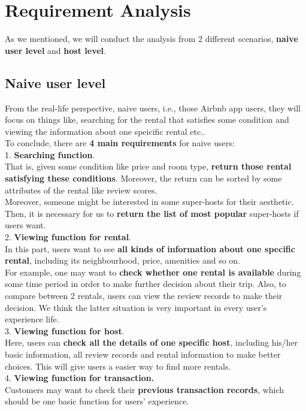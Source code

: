 \documentclass{article}
\begin{document}
	\section{Requirement Analysis}
	As we mentioned, we will conduct the analysis from 2 different scenarios, \textbf{naive user level} and \textbf{host level}.
	\subsection{Naive user level}
	From the real-life perspective, naive users, i.e., those Airbnb app users, they will focus on things like, searching for the rental that satisfies some condition and viewing the information about one speicific rental etc..
	\vspace{3pt}
	\\
	To conclude, there are \textbf{4 main requirements} for naive users:
	\vspace{3pt}
	\\
	1. \textbf{Searching function}. 
	\\
	That is, given some condition like price and room type, \textbf{return those rental satisfying these conditions}. Moreover, the return can be sorted by some attributes of the rental like review scores. 
	\\
	Moreover, someone might be interested in some super-hosts for their aesthetic. Then, it is necessary for us to \textbf{return the list of most popular} super-hosts if users want.
	\vspace{3pt}
	\\
	2. \textbf{Viewing function for rental}. 
	\\
	In this part, users want to see \textbf{all kinds of information about one specific rental}, including its neighbourhood, price, amenities and so on.
	\\
	For example, one may want to \textbf{check whether one rental is available }during some time period in order to make further decision about their trip. Also, to compare between 2 rentals, users can view the review records to make their decision. We think the latter situation is very important in every user's experience life.
	\vspace{3pt}
	\\
	3. \textbf{Viewing function for host}.
	\\
	Here, users can \textbf{check all the details of one specific host}, including his/her basic information, all review records and rental information to make better choices. This will give users a easier way to find more rentals.
	\vspace{3pt}
	\\
	4. \textbf{Viewing function for transaction.}
	\\
	Customers may want to check their \textbf{previous transaction records}, which should be one basic function for users' experience. 
\end{document}
